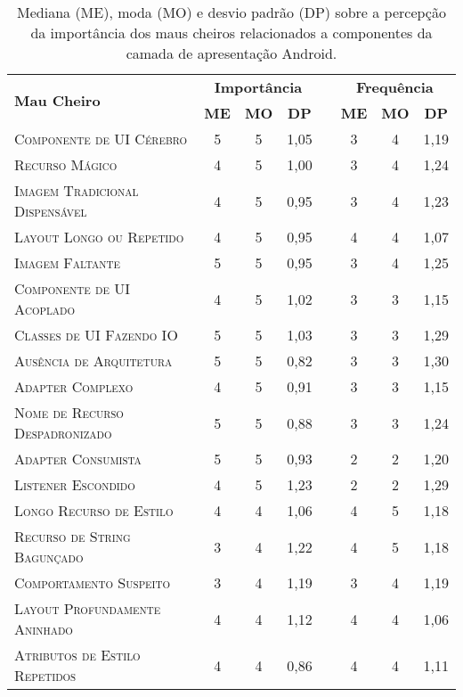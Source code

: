 \begin{table}[!htb]
\centering
\renewcommand*{\arraystretch}{1}
\footnotesize
\caption{Mediana (ME), moda (MO) e desvio padrão (DP) sobre a percepção da importância dos maus cheiros relacionados a componentes da camada de apresentação Android.}
\begin{tabular}{@{}p{9cm}cccp{.5cm}ccc@{}}
\toprule
\multirow{2}{*}{\textbf{Mau Cheiro}} & \multicolumn{3}{c}{\textbf{Importância}} & & \multicolumn{3}{c}{\textbf{Frequência}} \\ \cmidrule{2-4} \cmidrule{6-8}
                                      & \textbf{ME} & \textbf{MO} & \textbf{DP} & & \textbf{ME} & \textbf{MO} & \textbf{DP} \\
\bottomrule
\textsc{Componente de UI Cérebro} & 5 & 5 & 1,05 & & 3 & 4 & 1,19 \\
\textsc{Recurso Mágico} & 4 & 5 & 1,00 & & 3 & 4 & 1,24 \\
\textsc{Imagem Tradicional Dispensável} & 4 & 5 & 0,95 & & 3 & 4 & 1,23 \\
\textsc{Layout Longo ou Repetido} & 4 & 5 & 0,95 & & 4 & 4 & 1,07 \\
\textsc{Imagem Faltante} & 5 & 5 & 0,95 & & 3 & 4 & 1,25 \\
\textsc{Componente de UI Acoplado} & 4 & 5 & 1,02 & & 3 & 3 & 1,15 \\
\textsc{Classes de UI Fazendo IO} & 5 & 5 & 1,03 & & 3 & 3 & 1,29 \\
\textsc{Ausência de Arquitetura} & 5 & 5 & 0,82 & & 3 & 3 & 1,30 \\
\textsc{Adapter Complexo} & 4 & 5 & 0,91 & & 3 & 3 & 1,15 \\
\textsc{Nome de Recurso Despadronizado} & 5 & 5 & 0,88 & & 3 & 3 & 1,24 \\
\textsc{Adapter Consumista} & 5 & 5 & 0,93 & & 2 & 2 & 1,20 \\
\textsc{Listener Escondido} & 4 & 5 & 1,23 & & 2 & 2 & 1,29 \\
\textsc{Longo Recurso de Estilo} & 4 & 4 & 1,06 & & 4 & 5 & 1,18 \\
\textsc{Recurso de String Bagunçado} & 3 & 4 & 1,22 & & 4 & 5 & 1,18 \\
\textsc{Comportamento Suspeito} & 3 & 4 & 1,19 & & 3 & 4 & 1,19 \\
\textsc{Layout Profundamente Aninhado} & 4 & 4 & 1,12 & & 4 & 4 & 1,06 \\
\textsc{Atributos de Estilo Repetidos} & 4 & 4 & 0,86 & & 4 & 4 & 1,11 \\

\end{tabular}
\end{table}
